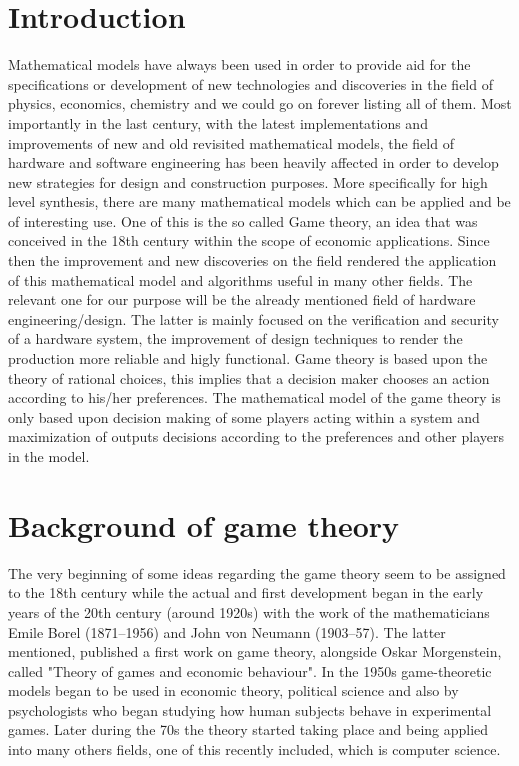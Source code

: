 \documentclass[conference]{IEEEtran}
\begin{document}
\section{Introduction}
Mathematical models have always been used in order to provide aid for the specifications or development of new technologies and discoveries in the field of physics, economics, chemistry and we could go on forever listing all of them. Most importantly in the last century, with the latest implementations and improvements of new and old revisited mathematical models, the field of hardware and software engineering has been heavily affected in order to develop new strategies for design and construction purposes. More specifically for high level synthesis, there are many mathematical models which can be applied and be of interesting use. One of this is the so called Game theory, an idea that was conceived in the 18th century within the scope of economic applications. Since then the improvement and new discoveries on the field rendered the application of this mathematical model and algorithms useful in many other fields. The relevant one for our purpose will be the already mentioned field of hardware engineering/design. The latter is mainly focused on the verification and security of a hardware system, the improvement of design techniques to render the production more reliable and higly functional. Game theory is based upon the theory of rational choices, this implies that a decision maker chooses an action according to his/her preferences. The mathematical model of the game theory is only based upon decision making of some players acting within a system and maximization of outputs decisions according to the preferences and other players in the model.



\section{Background of game theory}
The very beginning of some ideas regarding the game theory seem to be assigned to the 18th century while the actual and first development began in the early years of the 20th century (around 1920s) with the work of the mathematicians Emile Borel (1871–1956) and John von Neumann (1903–57). The latter mentioned, published a first work on game theory, alongside Oskar Morgenstein, called "Theory of games and economic behaviour". In the 1950s game-theoretic models began to be used in economic theory, political science and also by psychologists who began studying how human subjects behave in experimental games. Later during the 70s the theory started taking place and being applied into many others fields, one of this recently included, which is computer science\cite{b1}.
\end{document}

